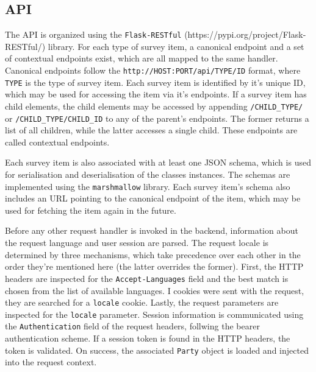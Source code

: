 \documentclass[a4paper,11pt]{article}
\def\inline{\lstinline[basicstyle=\ttfamily,keywordstyle={}]}
\begin{document}
        \subsection{API}
            The API is organized using the \inline{Flask-RESTful} (https://pypi.org/project/Flask-RESTful/)
            library. For each type of survey item, a canonical endpoint and a set of
            contextual endpoints exist, which are all mapped to the same handler.
            Canonical endpoints follow the \inline{http://HOST:PORT/api/TYPE/ID} format,
            where \inline{TYPE} is the type of survey item. Each survey item is identified
            by it's unique ID, which may be used for accessing the item via it's endpoints.
            If a survey item has child elements, the child elements may be accessed by
            appending \inline{/CHILD_TYPE/} or \inline{/CHILD_TYPE/CHILD_ID} to any
            of the parent's endpoints. The former returns a list of all children,
            while the latter accesses a single child. These endpoints are called
            contextual endpoints.

            Each survey item is also associated with at least one JSON schema,
            which is used for serialisation and deserialisation of the classes
            instances. The schemas are implemented using the \inline{marshmallow}
            library. Each survey item's schema also includes an URL pointing to
            the canonical endpoint of the item, which may be used for
            fetching the item again in the future.

            Before any other request handler is invoked in the backend,
            information about the request language and user session are parsed.
            The request locale is determined by three mechanisms, which take
            precedence over each other in the order they're mentioned here
            (the latter overrides the former). First, the HTTP headers
            are inspected for the \inline{Accept-Languages} field and the best
            match is chosen from the list of available languages.
            I cookies were sent with the request, they are searched for
            a \inline{locale} cookie. Lastly, the request parameters
            are inspected for the \inline{locale} parameter.
            Session information is communicated using the \inline{Authentication}
            field of the request headers, follwing the bearer authentication scheme.
            If a session token is found in the HTTP headers, the token is validated.
            On success, the associated \inline{Party} object is loaded and
            injected into the request context.    
\end{document}
